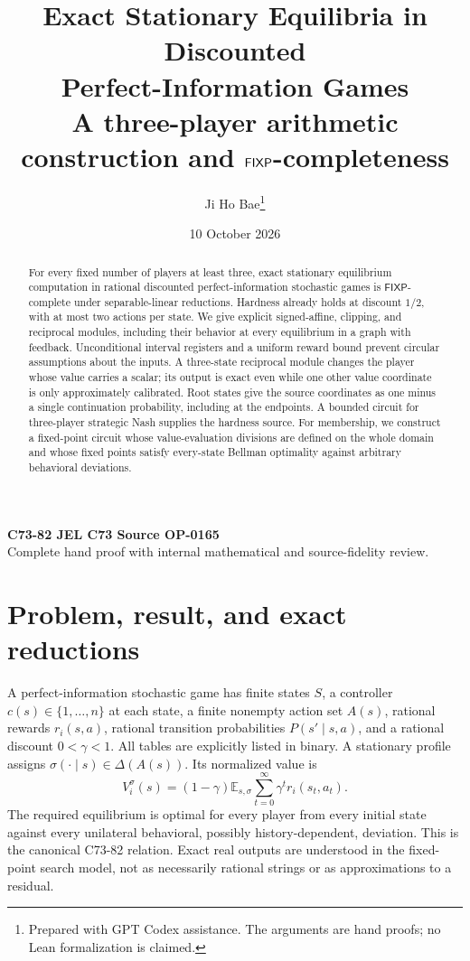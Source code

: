\documentclass[11pt,a4paper]{article}
\title{Exact Stationary Equilibria in Discounted\\
Perfect-Information Games\\[4pt]
\large A three-player arithmetic construction and \(\FIXP\)-completeness}
\author{Ji Ho Bae\thanks{Prepared with GPT Codex assistance. The arguments
are hand proofs; no Lean formalization is claimed.}}
\date{10 October 2026}
\numberwithin{equation}{section}
\theoremstyle{definition}
\newcommand{\E}{\mathbb E}
\newcommand{\FIXP}{\mathsf{FIXP}}
\begin{document}
\maketitle
\begin{center}
\small\textbf{C73-82 \quad JEL C73 \quad Source OP-0165}\\
Complete hand proof with internal mathematical and source-fidelity review.
\end{center}
\begin{abstract}
For every fixed number of players at least three, exact stationary
equilibrium computation in rational discounted perfect-information
stochastic games is \(\FIXP\)-complete under separable-linear reductions.
Hardness already holds at discount \(1/2\), with at most two actions per
state. We give explicit signed-affine, clipping, and reciprocal modules,
including their behavior at every equilibrium in a graph with feedback.
Unconditional interval registers and a uniform reward bound prevent
circular assumptions about the inputs. A three-state reciprocal module
changes the player whose value carries a scalar; its output is exact even
while one other value coordinate is only approximately calibrated.
Root states give the source coordinates as one minus a single continuation
probability, including at the endpoints. A bounded circuit for three-player
strategic Nash supplies the hardness source. For membership, we construct
a fixed-point circuit whose value-evaluation divisions are defined on the
whole domain and whose fixed points satisfy every-state Bellman
optimality against arbitrary behavioral deviations.
\end{abstract}

\section{Problem, result, and exact reductions}\label{sec:problem}

A perfect-information stochastic game has finite states \(S\), a controller
\(c(s)\in\{1,\ldots,n\}\) at each state, a finite nonempty action set
\(A(s)\), rational rewards \(r_i(s,a)\), rational transition probabilities
\(P(s'\mid s,a)\), and a rational discount \(0<\gamma<1\).
All tables are explicitly listed in binary. A stationary profile assigns
\(\sigma(\cdot\mid s)\in\Delta(A(s))\). Its normalized value is
\begin{equation}\label{eq:value}
 V_i^\sigma(s)=(1-\gamma)\E_{s,\sigma}
       \sum_{t=0}^{\infty}\gamma^t r_i(s_t,a_t).
\end{equation}
The required equilibrium is optimal for every player from every initial
state against every unilateral behavioral, possibly history-dependent,
deviation. This is the canonical C73-82 relation. Exact real outputs are
understood in the fixed-point search model, not as necessarily rational
strings or as approximations to a residual.
\end{document}
